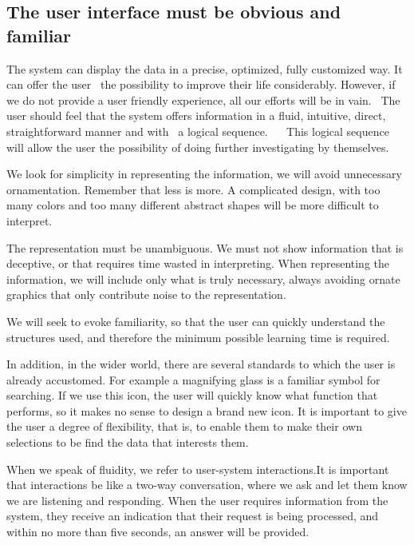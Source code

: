 \subsection{The user interface must be obvious and familiar}
The system can display the data in a precise, optimized, fully customized way. It can offer the user
 the possibility to improve their life considerably. However, if we do not provide a user friendly experience, all our efforts will be in vain.
 The user should feel that the system offers information in a fluid, intuitive, direct, straightforward manner and with
 a logical sequence.
  
This logical sequence will allow the user the possibility of doing further investigating by themselves.

We look for simplicity in representing the information, we will avoid unnecessary ornamentation. Remember that less is more. A complicated design, with too many colors and too many different abstract shapes will be more difficult to interpret.

The representation must be unambiguous. We must not show information that is deceptive, or that requires time wasted in interpreting. When representing the information, we will 
include only what is truly necessary, always avoiding ornate graphics that only contribute noise to the representation.

We will seek to evoke familiarity, so that the user can quickly understand the structures used,
and therefore the minimum possible learning time is required.

In addition, in the wider world, there are several standards to which the user is already accustomed.
For example a magnifying glass is a familiar symbol for searching. If we use this icon, the user will quickly know what
function that performs, so it makes no sense to design a brand new icon.
It is important to give the user a degree of flexibility, that is, to enable them to make their own selections to be find the data that interests them.

When we speak of fluidity, we refer to user-system interactions.It is important that interactions
be like a two-way conversation, where we ask and let them know we are listening and responding. When the user
requires information from the system, they receive an indication that their request is being processed, and within no more than five seconds, an answer will be provided.
    
